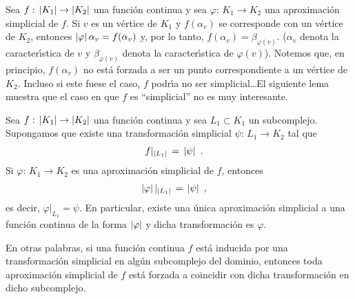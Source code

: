 \begin{obsDefinicionAproximacionSimplicial}%
	\label{obs:definicionaproximacionsimplicial}
	Sea $f:\,\left|K_{1}\right|\rightarrow\left|K_{2}\right|$ una funci\'{o}n continua
	y sea $\varphi:\,K_{1}\rightarrow K_{2}$ una aproximaci\'{o}n
	simplicial de $f$. Si $v$ es un v\'{e}rtice de $K_{1}$ y
	$f(\alpha_{v})$ se corresponde con un v\'{e}rtice de $K_{2}$, entonces
	$\left|\varphi\right|\alpha_{v}=f(\alpha_{v})$ y, por lo tanto,
	$f(\alpha_{v})=\beta_{\varphi(v)}$. ($\alpha_{v}$ denota la
	caracter\'{\i}stica de $v$ y $\beta_{\varphi(v)}$ denota la
	caracter\'{\i}stica de $\varphi(v)$). Notemos que, en principio,
	$f(\alpha_{v})$ no est\'{a} forzada a ser un punto correspondiente a
	un v\'{e}rtice de $K_{2}$. Incluso si este fuese el caso, $f$
	podr\'{\i}a no ser simplicial\dots El siguiente lema muestra que el
	caso en que $f$ es ``simplicial'' no es muy interesante.
\end{obsDefinicionAproximacionSimplicial}

\begin{lemaDefinicionAproximacionSimplicial}%
	\label{thm:definicionaproximacionsimplicial}
	Sea $f:\,\left|K_{1}\right|\rightarrow\left|K_{2}\right|$ una funci\'{o}n continua
	y sea $L_{1}\subset K_{1}$ un subcomplejo. Supongamos que existe una
	transformaci\'{o}n simplicial $\psi:\,L_{1}\rightarrow K_{2}$ tal que
	\begin{align*}
		f|_{\left|L_{1}\right|} & \,=\,\left|\psi\right|
		\text{ .}
	\end{align*}
	Si $\varphi:\,K_{1}\rightarrow K_{2}$ es una aproximaci\'{o}n
	simplicial de $f$, entonces
	\begin{align*}
		\left|\varphi\right||_{\left|L_{1}\right|} & \,=\,\left|\psi\right|
		\text{ ,}
	\end{align*}
	es decir, $\varphi|_{L_{1}}=\psi$. En particular, existe una
	\'{u}nica aproximaci\'{o}n simplicial a una funci\'{o}n continua
	de la forma $\left|\varphi\right|$ y dicha transformaci\'{o}n es $\varphi$.
\end{lemaDefinicionAproximacionSimplicial}

En otras palabras, si una funci\'{o}n continua $f$ est\'{a} inducida por
una transformaci\'{o}n simplicial en alg\'{u}n subcomplejo del dominio,
entonces toda aproximaci\'{o}n simplicial de $f$ est\'{a} forzada a
coincidir con dicha transformaci\'{o}n en dicho subcomplejo.


